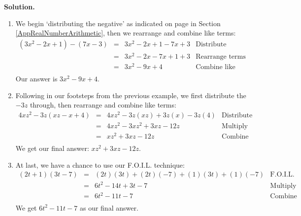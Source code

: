 \documentclass{ximera}
\begin{document}
\begin{ex}
\begin{multicols}{2}
\begin{enumerate}
\end{enumerate}

\end{multicols}



{\bf Solution.}

\begin{enumerate}

\item  We begin `distributing the negative' as indicated on page \pageref{propertiesofnegatives} in Section \ref{AppRealNumberArithmetic}, then we rearrange and combine like terms:\[\begin{array}{rclr}

\left(3x^2 - 2x + 1\right) - (7x-3) &  = & 3x^2-2x+1 - 7x + 3 & \text{Distribute} \\
                                    & = & 3x^2  -2x - 7x + 1 + 3 & \text{Rearrange terms} \\
																		& = & 3x^2 - 9x + 4 & \text{Combine like terms}  \\ 
																		\end {array} \] Our answer is $3x^2 - 9x + 4$.

\item  Following in our footsteps from the previous example, we first distribute the $-3z$ through, then rearrange and combine like terms:\[ \begin{array}{rclr}

4xz^2 - 3z(xz - x + 4) & = & 4xz^2 - 3z(xz) + 3z (x) - 3z(4) & \text{Distribute} \\
                       & = & 4xz^2 - 3xz^2 + 3xz - 12 z & \text{Multiply} \\
											 & = & xz^2+ 3xz - 12 z & \text{Combine like terms} \\

\end{array}\] We get our final answer: $xz^2+ 3xz - 12z$.


\item  At last, we have a chance to use our F.O.I.L. technique:\[ \begin{array}{rclr}

(2t+1)(3t - 7) & = & (2t)(3t) + (2t)(-7) + (1)(3t) + (1)(-7) & \text{F.O.I.L.} \\
               & = & 6t^2 - 14t + 3t - 7 & \text{Multiply} \\
							 & = & 6t^2 - 11t - 7 & \text{Combine like terms} \\
							\end{array} \] We get $6t^2 - 11t - 7$ as our final answer.


\end{enumerate}
\end{ex}
\end{document}
